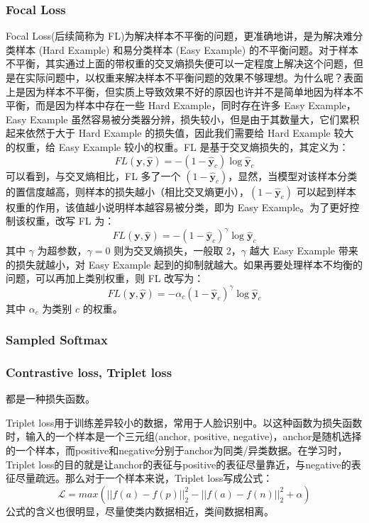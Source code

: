 \subsubsection{Focal Loss}
Focal Loss(后续简称为 FL)为解决样本不平衡的问题，更准确地讲，是为解决难分类样本 (Hard Example) 和易分类样本 (Easy Example) 的不平衡问题。对于样本不平衡，其实通过上面的带权重的交叉熵损失便可以一定程度上解决这个问题，但是在实际问题中，以权重来解决样本不平衡问题的效果不够理想。为什么呢？表面上是因为样本不平衡，但实质上导致效果不好的原因也许并不是简单地因为样本不平衡，而是因为样本中存在一些 Hard Example，同时存在许多 Easy Example，Easy Example 虽然容易被分类器分辨，损失较小，但是由于其数量大，它们累积起来依然于大于 Hard Example 的损失值，因此我们需要给 Hard Example 较大的权重，给 Easy Example 较小的权重。FL 是基于交叉熵损失的，其定义为：
$$
FL(\boldsymbol{y}, \hat{\boldsymbol{y}}) = -(1-\hat{\boldsymbol{y}}_c) \log \hat{\boldsymbol{y}}_c
$$
可以看到，与交叉熵相比，FL 多了一个 $(1-\hat{\boldsymbol{y}}_c)$，显然，当模型对该样本分类的置信度越高，则样本的损失越小（相比交叉熵更小），$(1-\hat{\boldsymbol{y}}_c)$ 可以起到样本权重的作用，该值越小说明样本越容易被分类，即为 Easy Example。为了更好控制该权重，改写 FL 为：
$$
FL(\boldsymbol{y}, \hat{\boldsymbol{y}}) = -(1-\hat{\boldsymbol{y}}_c)^\gamma \log \hat{\boldsymbol{y}}_c
$$
其中 $\gamma$ 为超参数，$\gamma=0$ 则为交叉熵损失，一般取 2，$\gamma$ 越大 Easy Example 带来的损失就越小，对 Easy Example 起到的抑制就越大。如果再要处理样本不均衡的问题，可以再加上类别权重，则 FL 改写为：
$$
FL(\boldsymbol{y}, \hat{\boldsymbol{y}}) = - \alpha_c (1-\hat{\boldsymbol{y}}_c)^\gamma \log \hat{\boldsymbol{y}}_c
$$
其中 $\alpha_c$ 为类别 $c$ 的权重。

\subsubsection{Sampled Softmax}

\subsubsection{Contrastive loss, Triplet loss} 
都是一种损失函数。

Triplet loss用于训练差异较小的数据，常用于人脸识别中。以这种函数为损失函数时，输入的一个样本是一个三元组(anchor, positive, negative)，anchor是随机选择的一个样本，而positive和negative分别于anchor为同类/异类数据。在学习时，Triplet loss的目的就是让anchor的表征与positive的表征尽量靠近，与negative的表征尽量疏远。那么对于一个样本来说，Triplet loss写成公式： 
$$
\mathcal{L} = max( ||f(a)-f(p)||_2^2 - ||f(a) - f(n)||_2^2 + \alpha )
$$
公式的含义也很明显，尽量使类内数据相近，类间数据相离。

